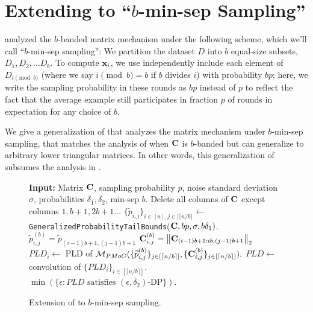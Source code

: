 \section{Extending \MMCC{} to ``$b$-min-sep Sampling''}\label{sec:mmcc-extension}

\cite{BandedMF} analyzed the $b$-banded matrix mechanism under the following scheme, which we'll call ``$b$-min-sep sampling'': We partition the dataset $D$ into $b$ equal-size subsets, $D_1, D_2, \ldots D_b$. To compute $\mathbf{x}_i$, we use independently include each element of $D_{i \pmod b}$ (where we say $i \pmod b = b$ if $b$ divides $i$) with probability $bp$; here, we write the sampling probability in these rounds as $bp$ instead of $p$ to reflect the fact that the average example still participates in fraction $p$ of rounds in expectation for any choice of $b$.

We give a generalization of \MMCC{} that analyzes the matrix mechanism under $b$-min-sep sampling, that matches the analysis of \cite{BandedMF} when $\mathbf{C}$ is $b$-banded but can generalize to arbitrary lower triangular matrices. In other words, this generalization of \MMCC{} subsumes the analysis in \cite{BandedMF}. 


\begin{figure}
\begin{algorithm}[H]
\caption{\texttt{Generalized-}\MMCC{}}
\begin{algorithmic}[1]
\State \textbf{Input:} Matrix $\mathbf{C}$, sampling probability $p$, noise standard deviation $\sigma$, probabilities $\delta_1, \delta_2$, min-sep $b$.
\State Delete all columns of $\mathbf{C}$ except columns $1, b + 1, 2b + 1 \ldots$
\State $\{\tilde{p}_{i,j}\}_{i \in [n], j \in [\lceil n / b \rceil} \leftarrow$\texttt{GeneralizedProbabilityTailBounds}($\mathbf{C}, bp, \sigma, b  \delta_1)$.\newline{}
\State $\tilde{p}^{(b)}_{i,j} = \tilde{p}_{(i-1)b + 1, (j-1)b + 1}$
\State $\mathbf{C}^{(b)}_{i,j} = \left\|\mathbf{C}_{(i-1)b + 1 : ib, (j-1)b + 1}\right\|_2$
\State $PLD_i \leftarrow$ PLD of $\mathcal{M}_{PMoG}(\{\widetilde{p}^{(b)}_{i, j}\}_{j \in [\lceil n/b \rceil]}, \{\mathbf{C}^{(b)}_{i, j}\}_{j \in [\lceil n/b \rceil]}).$
\EndFor
\State $PLD \leftarrow$ convolution of $\{PLD_i\}_{i \in [\lceil n/b \rceil]}$.
\State \Return $\min\left(\{\epsilon: PLD\text{ satisfies }(\epsilon, \delta_2)\text{-DP}\}\right)$.
\end{algorithmic}
\end{algorithm}
\caption{Extension of \CPTB{} to $b$-min-sep sampling.}
\label{fig:cptb-extension}
\end{figure}


